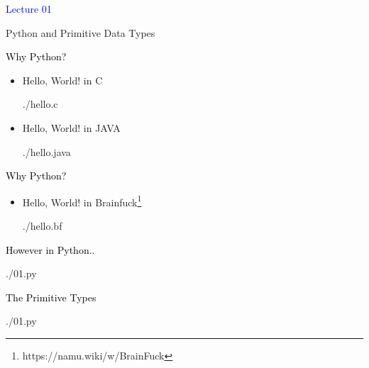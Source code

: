 \documentclass[landscape]{slides}
\begin{document}
\begin{slide}
\textcolor{blue}{\Large{Lecture 01}}

Python and Primitive Data Types
\end{slide}

\begin{slide}
\textcolor{black}{\large{Why Python?}}
\begin{itemize}
\vspace{-10mm}
    \item
    Hello, World! in C
    \begin{lstinputlisting}
      {./hello.c}
    \end{lstinputlisting}
\vspace{-10mm}
    \item
    Hello, World! in JAVA
    \begin{lstinputlisting}
      {./hello.java}
    \end{lstinputlisting}
\end{itemize}
\end{slide}

\begin{slide}
  \textcolor{black}{\large{Why Python?}}
\begin{itemize}
\vspace{-10mm}
    \item
      Hello, World! in Brainfuck\footnote{https://namu.wiki/w/BrainFuck}
    \begin{lstinputlisting}
      {./hello.bf}
    \end{lstinputlisting}

\end{itemize}
\end{slide}

\begin{slide}
  \textcolor{black}{\large{However in Python..}}
\end{slide}
\begin{slide}
\vspace{-10mm}
    \begin{lstinputlisting}[firstline=1, lastline=1]
      {./01.py}
    \end{lstinputlisting}
\end{slide}

\begin{slide}
  
  \textcolor{black}{\large{The Primitive Types}}
    \begin{lstinputlisting}[firstline=4, lastline=15]
      {./01.py}
    \end{lstinputlisting}
\end{slide}
\end{document}
